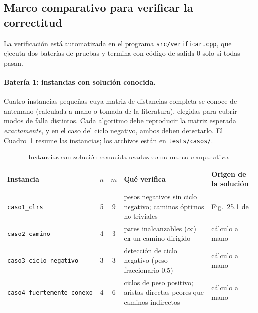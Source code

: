 \documentclass[11pt]{article}
\begin{document}
\pagebreak

\subsection{Marco comparativo para verificar la correctitud}
\label{sec:verificacion}

La verificación está automatizada en el programa \texttt{src/verificar.cpp},
que ejecuta dos baterías de pruebas y termina con código de salida $0$ solo
si todas pasan.

\paragraph{Batería 1: instancias con solución conocida.}
Cuatro instancias pequeñas cuya matriz de distancias completa se conoce de
antemano (calculada a mano o tomada de la literatura), elegidas para cubrir
modos de falla distintos. Cada algoritmo debe reproducir la matriz esperada
\emph{exactamente}, y en el caso del ciclo negativo, ambos deben detectarlo.
El Cuadro~\ref{tab:casos} resume las instancias; los archivos están en
\texttt{tests/casos/}.

\begin{table}[ht]
\centering
\begin{tabular}{lccp{5.6cm}l}
\toprule
Instancia & $n$ & $m$ & Qué verifica & Origen de la solución\\
\midrule
\texttt{caso1\_clrs} & 5 & 9 & pesos negativos sin ciclo negativo; caminos óptimos no triviales & Fig.~25.1 de \cite{clrs}\\
\texttt{caso2\_camino} & 4 & 3 & pares inalcanzables ($\infty$) en un camino dirigido & cálculo a mano\\
\texttt{caso3\_ciclo\_negativo} & 3 & 3 & detección de ciclo negativo (peso fraccionario $0.5$) & cálculo a mano\\
\texttt{caso4\_fuertemente\_conexo} & 4 & 6 & ciclos de peso positivo; aristas directas peores que caminos indirectos & cálculo a mano\\
\bottomrule
\end{tabular}
\caption{Instancias con solución conocida usadas como marco comparativo.}
\label{tab:casos}
\end{table}
\end{document}
